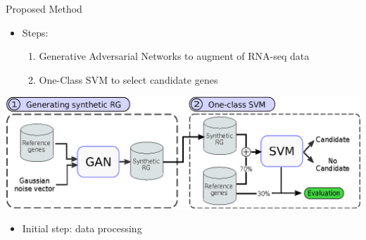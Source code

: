 \begin{frame}{Proposed Method}
\begin{center}

\begin{itemize}
    \item Steps:
      \begin{enumerate}
        \vspace{3pt}
        \item Generative Adversarial Networks to augment of RNA-seq data
        \vspace{3pt}
        \item One-Class SVM to select candidate genes
      \end{enumerate} 
\end{itemize}
\vspace{20pt}
\includegraphics[scale=.8]{figures/methodology_iccsa.eps}
\vspace{10pt}
\begin{itemize}
    \item Initial step: data processing
\end{itemize}
\end{center}
\end{frame}

